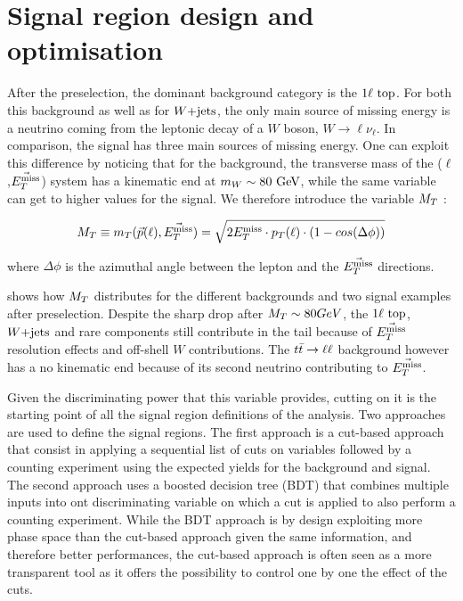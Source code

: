     \section{Signal region design and optimisation \label{sec:analysis_optimization}}

    After the preselection, the dominant background category is the $1\ell~\text{top}$.
    For both this background as well as for $\text{$W$+jets}$, the only main source of missing
    energy is a neutrino coming from the leptonic decay of a $W$ boson, $W \rightarrow
    \ell \nu_{\ell}$. In comparison, the signal has three main sources of missing energy.
    One can exploit this difference by noticing that for the background, the transverse
    mass of the ($\ell$,$\vec{E_T^\text{miss}}$) system has a kinematic end at $m_{W} \sim 80
    ~\text{GeV}$, while the same variable can get to higher values for the signal. We therefore
    introduce the variable $M_T$ :

    $$
    M_T
    \equiv
    m_T(\vec{p}(\ell),\vec{E_T^\text{miss}})
    =
    \sqrt{2 E_T^\text{miss} \cdot p_T(\ell) \cdot ( 1 - cos( \Delta \phi  ) ) }
    $$

    where $\Delta \phi$ is the azimuthal angle between the lepton and the $\vec{E_T^\text{miss}}$
    directions.

     shows how $M_T$ distributes for the different
    backgrounds and two signal examples after preselection. Despite the sharp drop after
    $M_T \sim 80 GeV$, the $1\ell~\text{top}$, $\text{$W$+jets}$ and rare components still contribute
    in the tail because of $\vec{E_T^\text{miss}}$ resolution effects and off-shell $W$ contributions.
    The $t\bar{t} \rightarrow \ell \ell$ background however has a no kinematic end because of its second
    neutrino contributing to $\vec{E_T^\text{miss}}$.

    Given the discriminating power that this variable provides, cutting on it is the
    starting point of all the signal region definitions of the analysis.
    Two approaches are used to define the signal regions. The first approach is a
    cut-based approach that consist in applying a sequential list of cuts on variables
    followed by a counting experiment using the expected yields for the background
    and signal. The second approach uses a boosted decision tree (BDT) that combines multiple inputs
    into ont discriminating variable on which a cut is applied to also perform a counting
    experiment. While the BDT approach is by design exploiting more phase space than the
    cut-based approach given the same information, and therefore better performances,
    the cut-based approach is often seen as a more transparent tool as it offers the
    possibility to control one by one the effect of the cuts.

